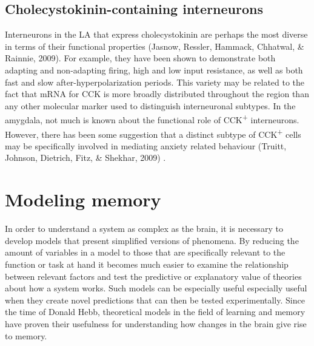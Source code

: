 \documentclass[12pt,a4paperpaper,]{report}
\begin{document}
\subsection{Cholecystokinin-containing
interneurons}\label{cholecystokinin-containing-interneurons}

Interneurons in the LA that express cholecystokinin are perhaps the most
diverse in terms of their functional properties (Jasnow, Ressler,
Hammack, Chhatwal, \& Rainnie, 2009). For example, they have been shown
to demonstrate both adapting and non-adapting firing, high and low input
resistance, as well as both fast and slow after-hyperpolarization
periods. This variety may be related to the fact that mRNA for CCK is
more broadly distributed throughout the region than any other molecular
marker used to distinguish interneuronal subtypes. In the amygdala, not
much is known about the functional role of CCK\textsuperscript{+}
interneurons. However, there has been some suggestion that a distinct
subtype of CCK\textsuperscript{+} cells may be specifically involved in
mediating anxiety related behaviour (Truitt, Johnson, Dietrich, Fitz, \&
Shekhar, 2009) .

\section{Modeling memory}\label{modeling-memory}

In order to understand a system as complex as the brain, it is necessary
to develop models that present simplified versions of phenomena. By
reducing the amount of variables in a model to those that are
specifically relevant to the function or task at hand it becomes much
easier to examine the relationship between relevant factors and test the
predictive or explanatory value of theories about how a system works.
Such models can be especially useful especially useful when they create
novel predictions that can then be tested experimentally. Since the time
of Donald Hebb, theoretical models in the field of learning and memory
have proven their usefulness for understanding how changes in the brain
give rise to memory.
\end{document}
